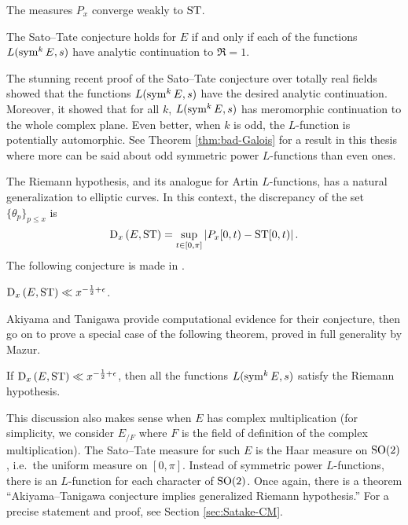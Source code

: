 \begin{theorem}
The measures $P_x$ converge weakly to $\mathrm{ST}$. 
\end{theorem}

\begin{theorem}
The Sato--Tate conjecture holds for $E$ if and only if each of 
the functions $L(\operatorname{sym}^k E,s)$ have analytic continuation to $\Re = 1$. 
\end{theorem}

The stunning recent proof of the Sato--Tate conjecture over totally real fields 
showed that the functions $L(\operatorname{sym}^k E,s)$ have the desired analytic 
continuation. Moreover, it showed that for all $k$, $L(\operatorname{sym}^k E,s)$ has 
meromorphic continuation to the whole complex plane. Even better, when $k$ is 
odd, the $L$-function is potentially automorphic. See Theorem 
\ref{thm:bad-Galois} for a result in this thesis where more can be said about 
odd symmetric power $L$-functions than even ones. 

The Riemann hypothesis, and its analogue for Artin $L$-functions, has a natural 
generalization to elliptic curves. In this context, the discrepancy of the set 
$\{\theta_p\}_{p\leqslant x}$ is 
\[
	\operatorname{D}_x\left(E,\mathrm{ST}\right) = \sup_{t\in [0,\pi]} \left| P_x[0,t) - \mathrm{ST}[0,t)\right| .
\]
The following conjecture is made in \cite{akiyama-tanigawa-1999}.

\begin{conjecture}\label{conj:akiyama-tanigawa}
$\operatorname{D}_x\left(E,\mathrm{ST}\right)\ll x^{-\frac 1 2+\epsilon}$.
\end{conjecture}

Akiyama and Tanigawa provide computational evidence for their conjecture, then 
go on to prove a special case of the following theorem, proved in full 
generality by Mazur. 

\begin{theorem}
If $\operatorname{D}_x\left(E,\mathrm{ST}\right)\ll x^{-\frac 1 2+\epsilon}$, 
then all the functions $L(\operatorname{sym}^k E, s)$ satisfy the Riemann hypothesis. 
\end{theorem}

This discussion also makes sense when $E$ has complex multiplication (for 
simplicity, we consider $E_{/F}$ where $F$ is the field of definition of the 
complex multiplication). The Sato--Tate measure for such $E$ is the Haar 
measure on $\operatorname{SO}(2)$, i.e.~the uniform measure on $[0,\pi]$. Instead of 
symmetric power $L$-functions, there is an $L$-function for each character of 
$\operatorname{SO}(2)$. Once again, there is a theorem ``Akiyama--Tanigawa conjecture implies 
generalized Riemann hypothesis.'' For a precise statement and proof, see Section 
\ref{sec:Satake-CM}.

